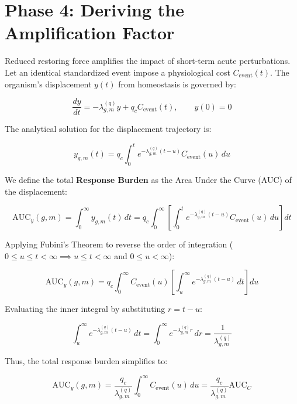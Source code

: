 \documentclass[11pt,a4paper]{article}
\begin{document}
\section{Phase 4: Deriving the Amplification Factor}

Reduced restoring force amplifies the impact of short-term acute perturbations. Let an identical standardized event impose a physiological cost $C_{\mathrm{event}}(t)$. The organism's displacement $y(t)$ from homeostasis is governed by:

\begin{equation}
\frac{dy}{dt} = -\lambda_{g,m}^{(q)}y + q_c C_{\mathrm{event}}(t), \qquad y(0)=0
\end{equation}

The analytical solution for the displacement trajectory is:

\begin{equation}
 y_{g,m}(t) = q_c \int_0^t e^{-\lambda_{g,m}^{(q)}(t-u)}C_{\mathrm{event}}(u)\,du
\end{equation}

We define the total \textbf{Response Burden} as the Area Under the Curve (AUC) of the displacement:

\begin{equation}
\text{AUC}_y(g,m) = \int_0^\infty y_{g,m}(t)\,dt = q_c \int_0^\infty \left[ \int_0^t e^{-\lambda_{g,m}^{(q)}(t-u)}C_{\mathrm{event}}(u)\,du \right] dt
\end{equation}

Applying Fubini's Theorem to reverse the order of integration ($0 \le u \le t < \infty \implies u \le t < \infty$ and $0 \le u < \infty$):

\begin{equation}
\text{AUC}_y(g,m) = q_c \int_0^\infty C_{\mathrm{event}}(u) \left[ \int_u^\infty e^{-\lambda_{g,m}^{(q)}(t-u)}\,dt \right] du
\end{equation}

Evaluating the inner integral by substituting $r = t - u$:

\begin{equation}
\int_u^\infty e^{-\lambda_{g,m}^{(q)}(t-u)}\,dt = \int_0^\infty e^{-\lambda_{g,m}^{(q)}r}\,dr = \frac{1}{\lambda_{g,m}^{(q)}}
\end{equation}

Thus, the total response burden simplifies to:

\begin{equation}
\text{AUC}_y(g,m) = \frac{q_c}{\lambda_{g,m}^{(q)}} \int_0^\infty C_{\mathrm{event}}(u)\,du = \frac{q_c}{\lambda_{g,m}^{(q)}} \text{AUC}_C
\end{equation}
\end{document}
